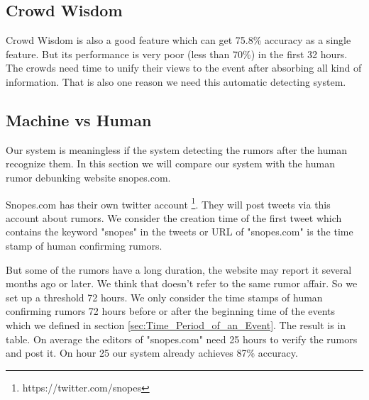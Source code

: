   \begin{table}[!h]
 \centering
{}
\caption{Ranks of CreditScore}
\label{tab:Rank_Credit}
\end{table}
  
  
 \subsection{Crowd Wisdom} 
Crowd Wisdom is also a good feature which can get 75.8\% accuracy as a single feature. But its performance is very poor (less than 70\%) in the first 32 hours. The crowds need time to unify their views to the event after absorbing all kind of information. That is also one reason we need this automatic detecting system. 

 \subsection{Machine vs Human } 
 Our system is meaningless if the system detecting the rumors after the human recognize them. In this section we will compare our system with the human rumor debunking website snopes.com. 
 
 Snopes.com has their own twitter account \footnote{https://twitter.com/snopes}. They will post tweets via this account about rumors. We consider the creation time of the first tweet which contains the keyword "snopes" in the tweets or URL of "snopes.com" is the time stamp of human confirming rumors. 
 
   But some of the rumors have a long duration, the website may report it several months ago or later. We think that doesn't refer to the same rumor affair. So we set up a threshold 72 hours. We only consider the time stamps of human confirming rumors 72 hours before or after the beginning time of the events which we defined in section \ref{sec:Time_Period_of_an_Event}. The result is in table. On average the editors of "snopes.com" need 25 hours to verify the rumors and post it. On hour 25 our system already achieves 87\% accuracy. 
   
  \begin{table}[!h]
 \centering
{}
\caption{Time of Human Confirming Rumors }
\label{tab:Rank_Credit}
\end{table}